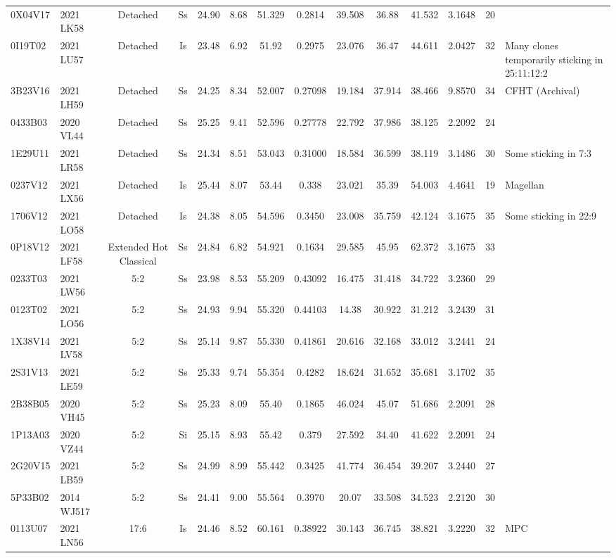 \begin{longrotatetable}
\begin{longtable}{ll|ccccccccccc | l}
0X04V17 & 2021 LK58 & Detached & Ss & 24.90 & 8.68 & 51.329 & 0.2814 & 39.508 & 36.88 & 41.532 & 3.1648 & 20 & \\ 
0I19T02 & 2021 LU57 & Detached & Is & 23.48 & 6.92 & 51.92 & 0.2975 & 23.076 & 36.47 & 44.611 & 2.0427 & 32 & Many clones temporarily sticking in 25:11:12:2  \\ 
3B23V16 & 2021 LH59 & Detached & Ss & 24.25 & 8.34 & 52.007 & 0.27098 & 19.184 & 37.914 & 38.466 & 9.8570 & 34 & CFHT (Archival)  \\ 
0433B03 & 2020 VL44 & Detached & Ss & 25.25 & 9.41 & 52.596 & 0.27778 & 22.792 & 37.986 & 38.125 & 2.2092 & 24 & \\ 
1E29U11 & 2021 LR58 & Detached & Ss & 24.34 & 8.51 & 53.043 & 0.31000 & 18.584 & 36.599 & 38.119 & 3.1486 & 30 & Some sticking in 7:3  \\ 
0237V12 & 2021 LX56 & Detached & Is & 25.44 & 8.07 & 53.44 & 0.338 & 23.021 & 35.39 & 54.003 & 4.4641 & 19 & Magellan  \\ 
1706V12 & 2021 LO58 & Detached & Is & 24.38 & 8.05 & 54.596 & 0.3450 & 23.008 & 35.759 & 42.124 & 3.1675 & 35 & Some sticking in 22:9  \\ 
0P18V12 & 2021 LF58 & Extended Hot Classical & Ss & 24.84 & 6.82 & 54.921 & 0.1634 & 29.585 & 45.95 & 62.372 & 3.1675 & 33 & \\ 
0233T03 & 2021 LW56 & 5:2 & Ss & 23.98 & 8.53 & 55.209 & 0.43092 & 16.475 & 31.418 & 34.722 & 3.2360 & 29 & \\ 
0123T02 & 2021 LO56 & 5:2 & Ss & 24.93 & 9.94 & 55.320 & 0.44103 & 14.38 & 30.922 & 31.212 & 3.2439 & 31 & \\ 
1X38V14 & 2021 LV58 & 5:2 & Ss & 25.14 & 9.87 & 55.330 & 0.41861 & 20.616 & 32.168 & 33.012 & 3.2441 & 24 & \\ 
2S31V13 & 2021 LE59 & 5:2 & Ss & 25.33 & 9.74 & 55.354 & 0.4282 & 18.624 & 31.652 & 35.681 & 3.1702 & 35 & \\ 
2B38B05 & 2020 VH45 & 5:2 & Ss & 25.23 & 8.09 & 55.40 & 0.1865 & 46.024 & 45.07 & 51.686 & 2.2091 & 28 & \\ 
1P13A03 & 2020 VZ44 & 5:2 & Si & 25.15 & 8.93 & 55.42 & 0.379 & 27.592 & 34.40 & 41.622 & 2.2091 & 24 & \\ 
2G20V15 & 2021 LB59 & 5:2 & Ss & 24.99 & 8.99 & 55.442 & 0.3425 & 41.774 & 36.454 & 39.207 & 3.2440 & 27 & \\ 
5P33B02 & 2014 WJ517 & 5:2 & Ss & 24.41 & 9.00 & 55.564 & 0.3970 & 20.07 & 33.508 & 34.523 & 2.2120 & 30 & \\ 
0113U07 & 2021 LN56 & 17:6 & Is & 24.46 & 8.52 & 60.161 & 0.38922 & 30.143 & 36.745 & 38.821 & 3.2220 & 32 & MPC  \\ 

\end{longtable}
\end{longrotatetable}
